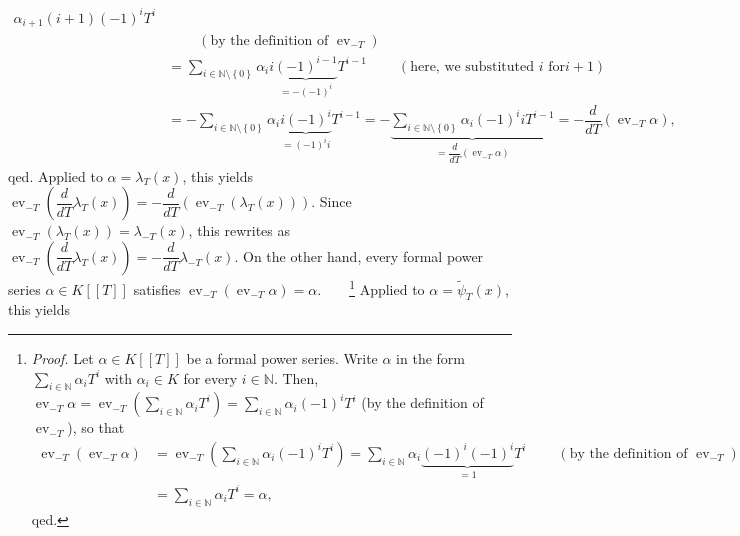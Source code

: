 \documentclass[numbers=enddot,12pt,final,onecolumn,notitlepage]{scrartcl}%
\begin{document}
{\begin{align*}
{}\alpha_{i+1}\left(  i+1\right)  \left(  -1\right)  ^{i}T^{i}\\
&  \ \ \ \ \ \ \ \ \ \ \left(  \text{by the definition of }\operatorname*{ev}%
\nolimits_{-T}\right) \\
&  =\sum\limits_{i\in\mathbb{N}\setminus\left\{  0\right\}  }\alpha
_{i}i\underbrace{\left(  -1\right)  ^{i-1}}_{=-\left(  -1\right)  ^{i}}%
T^{i-1}\ \ \ \ \ \ \ \ \ \ \left(  \text{here, we substituted }i\text{ for
}i+1\right) \\
&  =-\sum\limits_{i\in\mathbb{N}\setminus\left\{  0\right\}  }\alpha
_{i}\underbrace{i\left(  -1\right)  ^{i}}_{=\left(  -1\right)  ^{i}i}%
T^{i-1}=-\underbrace{\sum\limits_{i\in\mathbb{N}\setminus\left\{  0\right\}
}\alpha_{i}\left(  -1\right)  ^{i}iT^{i-1}}_{=\dfrac{d}{dT}\left(
\operatorname*{ev}\nolimits_{-T}\alpha\right)  }=-\dfrac{d}{dT}\left(
\operatorname*{ev}\nolimits_{-T}\alpha\right)  ,
\end{align*}
qed.} Applied to $\alpha=\lambda_{T}\left(  x\right)  $, this yields
$\operatorname*{ev}\nolimits_{-T}\left(  \dfrac{d}{dT}\lambda_{T}\left(
x\right)  \right)  =-\dfrac{d}{dT}\left(  \operatorname*{ev}\nolimits_{-T}%
\left(  \lambda_{T}\left(  x\right)  \right)  \right)  $. Since
$\operatorname*{ev}\nolimits_{-T}\left(  \lambda_{T}\left(  x\right)  \right)
=\lambda_{-T}\left(  x\right)  $, this rewrites as $\operatorname*{ev}%
\nolimits_{-T}\left(  \dfrac{d}{dT}\lambda_{T}\left(  x\right)  \right)
=-\dfrac{d}{dT}\lambda_{-T}\left(  x\right)  $. On the other hand, every
formal power series $\alpha\in K\left[  \left[  T\right]  \right]  $ satisfies
$\operatorname*{ev}\nolimits_{-T}\left(  \operatorname*{ev}\nolimits_{-T}%
\alpha\right)  =\alpha$.\ \ \ \ \footnote{\textit{Proof.} Let $\alpha\in
K\left[  \left[  T\right]  \right]  $ be a formal power series. Write $\alpha$
in the form $\sum\limits_{i\in\mathbb{N}}\alpha_{i}T^{i}$ with $\alpha_{i}\in
K$ for every $i\in\mathbb{N}$. Then, $\operatorname*{ev}\nolimits_{-T}%
\alpha=\operatorname*{ev}\nolimits_{-T}\left(  \sum\limits_{i\in\mathbb{N}%
}\alpha_{i}T^{i}\right)  =\sum\limits_{i\in\mathbb{N}}\alpha_{i}\left(
-1\right)  ^{i}T^{i}$ (by the definition of $\operatorname*{ev}\nolimits_{-T}%
$), so that%
\begin{align*}
\operatorname*{ev}\nolimits_{-T}\left(  \operatorname*{ev}\nolimits_{-T}%
\alpha\right)   &  =\operatorname*{ev}\nolimits_{-T}\left(  \sum
\limits_{i\in\mathbb{N}}\alpha_{i}\left(  -1\right)  ^{i}T^{i}\right)
=\sum\limits_{i\in\mathbb{N}}\alpha_{i}\underbrace{\left(  -1\right)
^{i}\left(  -1\right)  ^{i}}_{=1}T^{i}\ \ \ \ \ \ \ \ \ \ \left(  \text{by the
definition of }\operatorname*{ev}\nolimits_{-T}\right) \\
&  =\sum\limits_{i\in\mathbb{N}}\alpha_{i}T^{i}=\alpha,
\end{align*}
qed.} Applied to $\alpha=\widetilde{\psi}_{T}\left(  x\right)  $, this yields
\end{document}
